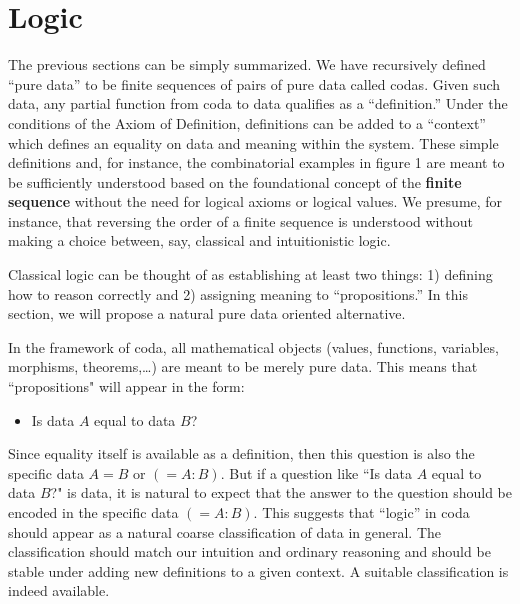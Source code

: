 \documentclass[11pt]{article}
\begin{document}
\section{Logic}

The previous sections can be simply summarized.  We have recursively defined ``pure data'' to be finite sequences of pairs of pure data called codas.  Given such 
data,  any partial function from coda to data qualifies as a ``definition.''  Under the conditions of the Axiom of Definition, definitions can be added to 
a ``context'' which defines an equality on data and meaning within the system.  
These simple definitions and, for instance, the combinatorial examples in figure 1 are meant to be sufficiently understood based on the foundational concept 
of the {\bf finite sequence} without the need for logical axioms or logical values.   We presume, for instance, that reversing the order of a finite 
sequence is understood without making a choice between, say, classical and intuitionistic logic.  

     Classical logic can be thought of as establishing at least two things: 1) defining how to reason correctly and 2) assigning meaning to ``propositions.''   
In this section, we will propose a natural pure data oriented alternative.  

    In the framework of coda, all mathematical objects (values, functions, variables, morphisms, theorems,\dots) are meant to be merely pure data.  This means 
that ``propositions" will appear in the form: 
\begin{itemize}
\item[] Is data $A$ equal to data $B$?
\end{itemize}
Since equality itself is available as a definition, then this question is also the specific data $A=B$ or $(=A:B)$.  But if a question like ``Is data $A$ equal to data $B$?" is data, 
it is natural to expect that the answer to the question should be encoded in the specific data $(=A:B)$.  This suggests that ``logic'' in coda should appear as 
a natural coarse classification of data in general.  The classification should match our intuition and ordinary reasoning and should be stable under 
adding new definitions to a given context.  A suitable classification is indeed available.  
\end{document}
